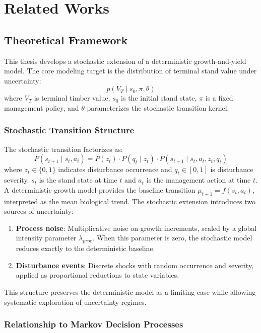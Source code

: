 \documentclass[12pt]{report}
\begin{document}
\chapter{Related Works}

\section{Theoretical Framework}

This thesis develops a stochastic extension of a deterministic growth-and-yield model. The core modeling target is the distribution of terminal stand value under uncertainty:
\[
p(V_T \mid s_0, \pi, \theta)
\]
where $V_T$ is terminal timber value, $s_0$ is the initial stand state, $\pi$ is a fixed management policy, and $\theta$ parameterizes the stochastic transition kernel.

\subsection{Stochastic Transition Structure}

The stochastic transition factorizes as:
\[
P(s_{t+1} \mid s_t, a_t) = P(z_t) \cdot P(q_t \mid z_t) \cdot P(s_{t+1} \mid s_t, a_t, z_t, q_t)
\]
where $z_t \in \{0,1\}$ indicates disturbance occurrence and $q_t \in [0,1]$ is disturbance severity. $s_t$ is the stand state at time $t$ and $a_t$ is the management action at time $t$. A deterministic growth model provides the baseline transition $\mu_{t+1} = f(s_t, a_t)$, interpreted as the mean biological trend. The stochastic extension introduces two sources of uncertainty:

\begin{enumerate}
    \item \textbf{Process noise}: Multiplicative noise on growth increments, scaled by a global intensity parameter $\lambda_{proc}$. When this parameter is zero, the stochastic model reduces exactly to the deterministic baseline.
    \item \textbf{Disturbance events}: Discrete shocks with random occurrence and severity, applied as proportional reductions to state variables.
\end{enumerate}

This structure preserves the deterministic model as a limiting case while allowing systematic exploration of uncertainty regimes.

\subsection{Relationship to Markov Decision Processes}
\end{document}
